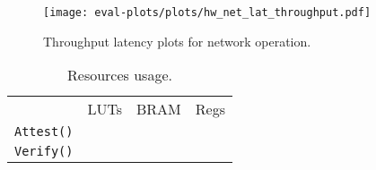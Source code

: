 \begin{figure}[t!]
    \centering
    \texttt{[image: eval-plots/plots/hw\_net\_lat\_throughput.pdf]}
    \caption{Throughput latency plots for network operation.}
    \label{fig:hw_lat_breakdown}
\end{figure}
\fi

\begin{center}
\begin{table}[ht]
\centering
\begin{tabular}{ |m{1.5cm}||m{1cm}| m{1cm}| m{1cm}|}
 \hline
  & LUTs &  BRAM & Regs  \\
 \texttt{Attest()} &  &  &\\
 \texttt{Verify()} &  &  &\\
 \hline
 \end{tabular}
\caption{Resources usage.}
\end{table}\label{table:resources_usage}
\end{center}
\fi

